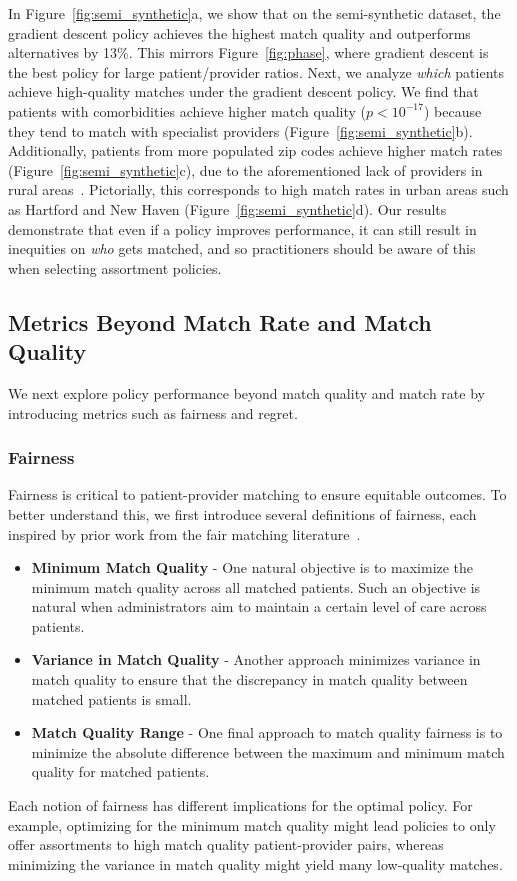 \documentclass[11pt]{article}
\begin{document}
In Figure~\ref{fig:semi_synthetic}a, we show that on the semi-synthetic dataset, the gradient descent policy achieves the highest match quality and outperforms alternatives by 13\%. 
This mirrors Figure~\ref{fig:phase}, where gradient descent is the best policy for large patient/provider ratios.  
Next, we analyze \textit{which} patients achieve high-quality matches under the gradient descent policy. 
We find that patients with comorbidities achieve higher match quality ($p<10^{-17}$) because they tend to match with specialist providers (Figure~\ref{fig:semi_synthetic}b).
Additionally, patients from more populated zip codes achieve higher match rates (Figure~\ref{fig:semi_synthetic}c), due to the aforementioned lack of providers in rural areas~\citep{rural_health_care}. 
Pictorially, this corresponds to high match rates in urban areas such as Hartford and New Haven (Figure~\ref{fig:semi_synthetic}d).
Our results demonstrate that even if a policy improves performance, it can still result in inequities on \textit{who} gets matched, and so practitioners should be aware of this when selecting assortment policies. 

\subsection{Metrics Beyond Match Rate and Match Quality}
We next explore policy performance beyond match quality and match rate by introducing metrics such as fairness and regret. 

\subsubsection{Fairness}
\label{sec:fair}
Fairness is critical to patient-provider matching to ensure equitable outcomes. 
To better understand this, we first introduce several definitions of fairness, each inspired by prior work from the fair matching literature~\citep{fairness_optimization,fair_minimax}. 
\begin{itemize}
    \item \textbf{Minimum Match Quality} - One natural objective is to maximize the minimum match quality across all matched patients. Such an objective is natural when administrators aim to maintain a certain level of care across patients. 
    \item \textbf{Variance in Match Quality} - Another approach minimizes variance in match quality to ensure that the discrepancy in match quality between matched patients is small. 
    \item \textbf{Match Quality Range} - One final approach to match quality fairness is to minimize the absolute difference between the maximum and minimum match quality for matched patients. 
\end{itemize}
Each notion of fairness has different implications for the optimal policy. 
For example, optimizing for the minimum match quality might lead policies to only offer assortments to high match quality patient-provider pairs, whereas minimizing the variance in match quality might yield many low-quality matches.  
\end{document}
